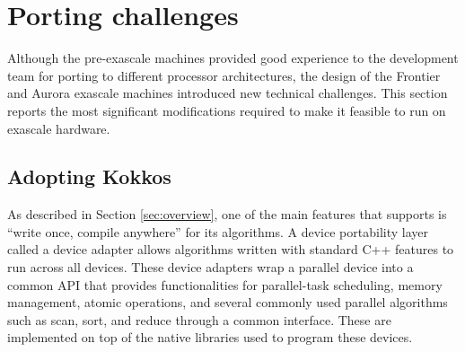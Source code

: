 \section{Porting challenges}

Although the pre-exascale machines provided good experience to the \vtkm development team for porting to different processor architectures, the design of the Frontier and Aurora exascale machines introduced new technical challenges.
This section reports the most significant modifications required to make it feasible to run \vtkm on exascale hardware.


\subsection{Adopting Kokkos}
\label{sec:adopting-kokkos}


As described in Section \ref{sec:overview},
one of the main features that \vtkm supports is ``write once, compile anywhere'' for its algorithms.
A device portability layer called a device adapter allows algorithms written with standard C++ features to run across all devices.
These device adapters wrap a parallel device into a common API that provides functionalities for parallel-task scheduling, memory management, atomic operations, and several commonly used parallel algorithms such as scan, sort, and reduce through a common interface.
These are implemented on top of the native libraries used to program these devices.

